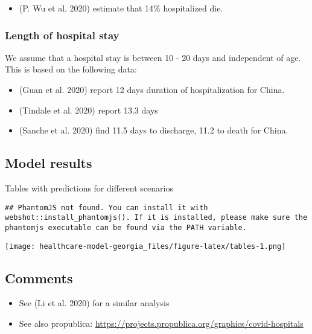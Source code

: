 \documentclass[
]{article}
\providecommand{\tightlist}{%
  \setlength{\itemsep}{0pt}\setlength{\parskip}{0pt}}
\begin{document}
\begin{itemize}
\tightlist
\item
  (P. Wu et al. 2020) estimate that 14\% hospitalized die.
\end{itemize}

\hypertarget{length-of-hospital-stay}{%
\subsubsection{Length of hospital stay}\label{length-of-hospital-stay}}

We assume that a hospital stay is between 10 - 20 days and independent
of age. This is based on the following data:

\begin{itemize}
\tightlist
\item
  (Guan et al. 2020) report 12 days duration of hospitalization for
  China.
\item
  (Tindale et al. 2020) report 13.3 days
\item
  (Sanche et al. 2020) find 11.5 days to discharge, 11.2 to death for
  China.
\end{itemize}

\hypertarget{model-results}{%
\subsection{Model results}\label{model-results}}

Tables with predictions for different scenarios

\begin{verbatim}
## PhantomJS not found. You can install it with webshot::install_phantomjs(). If it is installed, please make sure the phantomjs executable can be found via the PATH variable.
\end{verbatim}

\texttt{[image: healthcare-model-georgia\_files/figure-latex/tables-1.png]}

\hypertarget{comments}{%
\subsection{Comments}\label{comments}}

\begin{itemize}
\tightlist
\item
  See (Li et al. 2020) for a similar analysis
\item
  See also propublica:
  \url{https://projects.propublica.org/graphics/covid-hospitals}
\end{itemize}
\end{document}

